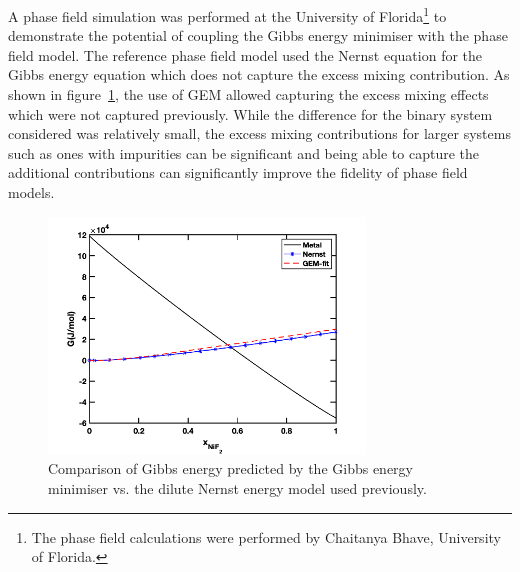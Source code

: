 A phase field simulation was performed at the University of Florida\footnote{The phase field calculations were performed by Chaitanya Bhave, University of Florida.} to demonstrate the potential of coupling the Gibbs energy minimiser with the phase field model. The reference phase field model used the Nernst equation for the Gibbs energy equation which does not capture the excess mixing contribution. As shown in figure~\ref{fig:pfgibbs}, the use of GEM allowed capturing the excess mixing effects which were not captured previously. While the difference for the binary system considered was relatively small, the excess mixing contributions for larger systems such as ones with impurities can be significant and being able to capture the additional contributions can significantly improve the fidelity of phase field models.
    \begin{figure}[h!]
        \centering
        \includegraphics[width=0.75\textwidth]{figures/chapter-7/gibbs.png}
        \caption{Comparison of Gibbs energy predicted by the Gibbs energy minimiser vs. the dilute Nernst energy model used previously.}
        \label{fig:pfgibbs}
    \end{figure}

